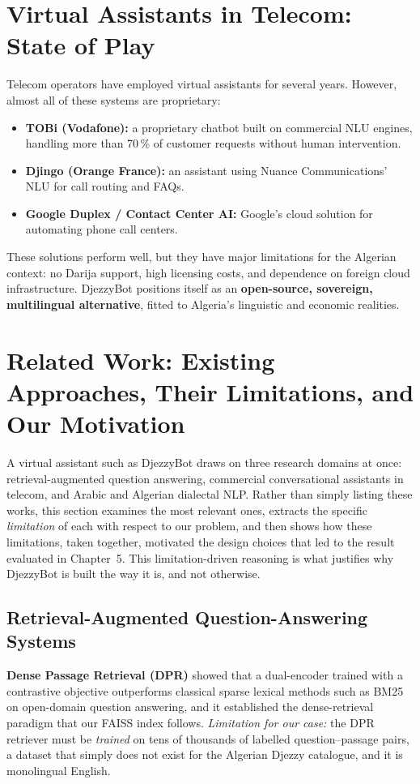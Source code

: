 \documentclass[12pt, a4paper]{report}
\newcommand{\sourced}[1]{#1}        %
\newcommand{\aitext}[1]{#1}         %
\newcommand{\humantext}[1]{#1}      %
\begin{document}
\section{Virtual Assistants in Telecom: State of Play}
\humantext{Telecom operators have employed virtual assistants for several years. However, almost all of these systems are proprietary:}
\begin{itemize}
    \item \aitext{\textbf{TOBi (Vodafone):} a proprietary chatbot built on commercial NLU engines, handling more than 70\,\% of customer requests without human intervention.}
    \item \aitext{\textbf{Djingo (Orange France):} an assistant using Nuance Communications' NLU for call routing and FAQs.}
    \item \aitext{\textbf{Google Duplex / Contact Center AI:} Google's cloud solution for automating phone call centers.}
\end{itemize}

\humantext{These solutions perform well, but they have major limitations for the Algerian context: no Darija support, high licensing costs, and dependence on foreign cloud infrastructure. DjezzyBot positions itself as an \textbf{open-source, sovereign, multilingual alternative}, fitted to Algeria's linguistic and economic realities.}

\section{Related Work: Existing Approaches, Their Limitations, and Our Motivation}
\humantext{A virtual assistant such as DjezzyBot draws on three research domains at once: retrieval-augmented question answering, commercial conversational assistants in telecom, and Arabic and Algerian dialectal NLP. Rather than simply listing these works, this section examines the most relevant ones, extracts the specific \emph{limitation} of each with respect to our problem, and then shows how these limitations, taken together, motivated the design choices that led to the result evaluated in Chapter~5. This limitation-driven reasoning is what justifies why DjezzyBot is built the way it is, and not otherwise.}

\subsection{Retrieval-Augmented Question-Answering Systems}
\sourced{\textbf{Dense Passage Retrieval (DPR)} \cite{karpukhin2020dpr} showed that a dual-encoder trained with a contrastive objective outperforms classical sparse lexical methods such as BM25 on open-domain question answering, and it established the dense-retrieval paradigm that our FAISS index follows.} \humantext{\emph{Limitation for our case:} the DPR retriever must be \emph{trained} on tens of thousands of labelled question--passage pairs, a dataset that simply does not exist for the Algerian Djezzy catalogue, and it is monolingual English.}
\end{document}
